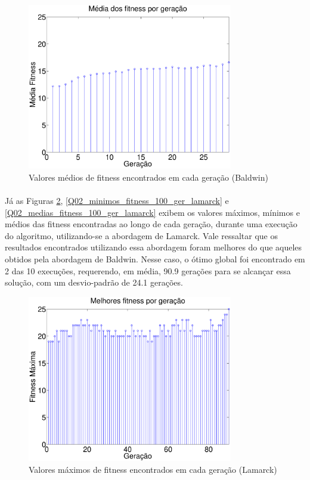 \documentclass{report}
\begin{document}
\begin{figure}[H]
	\centering
	\includegraphics[width = 0.8\textwidth]{Q02_medias_fitness_100_ger_baldwin.eps}
	\caption{Valores médios de fitness encontrados em cada geração (Baldwin)}	
	\label{Q02_medias_fitness_100_ger_baldwin}
\end{figure}   

\paragraph{} Já as Figuras \ref{Q02_maximos_fitness_100_ger_lamarck}, \ref{Q02_minimos_fitness_100_ger_lamarck} e \ref{Q02_medias_fitness_100_ger_lamarck} exibem os valores máximos, mínimos e médios das fitness encontradas ao longo de cada geração, durante uma execução do algoritmo, utilizando-se a abordagem de Lamarck. Vale ressaltar que os resultados encontrados utilizando essa abordagem foram melhores do que aqueles obtidos pela abordagem de Baldwin. Nesse caso, o ótimo global foi encontrado em 2 das 10 execuções, requerendo, em média, 90.9 gerações para se alcançar essa solução, com um desvio-padrão de 24.1 gerações.\\

\begin{figure}[H]
	\centering
	\includegraphics[width = 0.8\textwidth]{Q02_maximos_fitness_100_ger_lamarck.eps}
	\caption{Valores máximos de fitness encontrados em cada geração (Lamarck)}
	\label{Q02_maximos_fitness_100_ger_lamarck}
\end{figure}   
\end{document}
